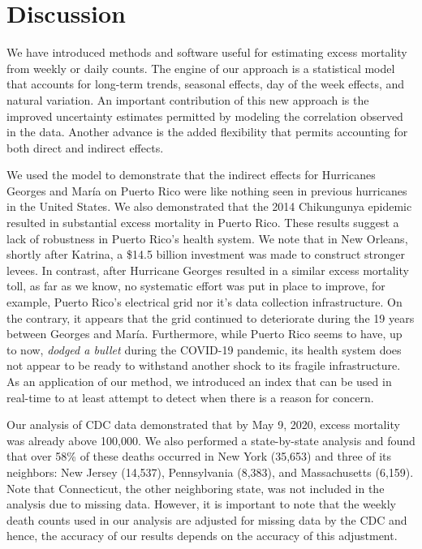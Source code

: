 \documentclass[11pt]{article}
\begin{document}
\section{Discussion}
We have introduced methods and software useful for estimating excess mortality from weekly or daily counts. The engine of our approach is a statistical model that accounts for long-term trends, seasonal effects, day of the week effects, and natural variation. An important contribution of this new approach is the improved uncertainty estimates permitted by modeling the correlation observed in the data. Another advance is the added flexibility that permits accounting for both direct and indirect effects.

We used the model to demonstrate that the indirect effects for Hurricanes Georges and Mar\'ia on Puerto Rico were like nothing seen in previous hurricanes in the United States. We also demonstrated that the 2014 Chikungunya epidemic resulted in substantial excess mortality in Puerto Rico. These results suggest a lack of robustness in Puerto Rico's health system. We note that in New Orleans, shortly after Katrina, a \$14.5 billion investment was made to construct stronger levees\cite{kates2006reconstruction, interagency2007performance, adelson2018}. In contrast, after Hurricane Georges resulted in a similar excess mortality toll, as far as we know, no systematic effort was put in place to improve, for example, Puerto Rico’s electrical grid nor it's data collection infrastructure. On the contrary, it appears that the grid continued to deteriorate during the 19 years between Georges and Mar\'ia. Furthermore, while Puerto Rico seems to have, up to now, \emph{dodged a bullet} during the COVID-19 pandemic, its health system does not appear to be ready to withstand another shock to its fragile infrastructure. As an application of our method, we introduced an index that can be used in real-time to at least attempt to detect when there is a reason for concern.

Our analysis of CDC data demonstrated that by May 9, 2020, excess mortality was already above 100,000. We also performed a state-by-state analysis and found that over 58\% of these deaths occurred in New York (35,653) and three of its neighbors: New Jersey (14,537), Pennsylvania (8,383), and Massachusetts (6,159). Note that Connecticut, the other neighboring state, was not included in the analysis due to missing data. However, it is important to note that the weekly death counts used in our analysis are adjusted for missing data by the CDC \cite{cdc2020covid19} and hence, the accuracy of our results depends on the accuracy of this adjustment.
\end{document}
